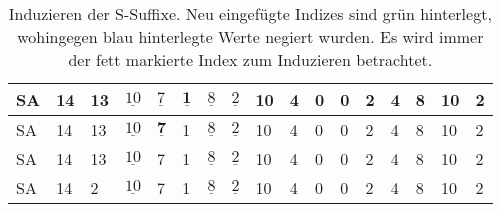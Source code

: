 \begin{table}
{\begin{tabular}{l|lllllllllllllll|l}
			SA & 14                         & 13 & $\underline{10}$ & \cellcolor[HTML]{32CB00}$\underline{7}$ & $\underline{\textbf{1}}$                & \cellcolor[HTML]{34CDF9}$\underline{8}$ & $\underline{2}$                         & 10                         & 4                         & 0 & 0  & 2  & 4  & 8  & 10 & \cellcolor[HTML]{32CB00}2 \\ \hline
			SA & 14                         & 13 & $\underline{10}$ & $\underline{\textbf{7}}$                & \cellcolor[HTML]{34CDF9}1               & $\underline{8}$                         & $\underline{2}$                         & 10                         & 4                         & 0 & 0  & 2  & 4  & 8  & 10 & 2                         \\ \hline
			SA & 14                         & 13 & $\underline{10}$ & \cellcolor[HTML]{34CDF9}7               & 1                                       & $\underline{8}$                         & $\underline{2}$                         & 10                         & 4                         & 0 & 0  & 2  & 4  & 8  & 10 & 2                         \\ \hline
			SA & \cellcolor[HTML]{32CB00}14 & 2  & $\underline{10}$ & 7                                       & 1                                       & $\underline{8}$                         & $\underline{2}$                         & 10                         & 4                         & 0 & 0  & 2  & 4  & 8  & 10 & 2 \\ \hline                       
		\end{tabular}%
	}
	\caption{Induzieren der S-Suffixe. Neu eingefügte Indizes sind grün hinterlegt, wohingegen blau hinterlegte Werte negiert wurden. Es wird immer der fett markierte Index zum Induzieren betrachtet.}
	\label{dss:table:induce-s}
\end{table}

